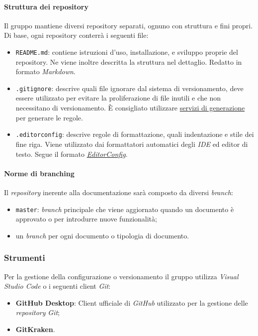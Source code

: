 		\paragraph{Struttura dei repository}
		Il gruppo mantiene diversi repository separati, ognuno con struttura e fini propri.
		Di base, ogni repository conterrà i seguenti file:
		\begin{itemize}
			\item \verb#README.md#: contiene istruzioni d'uso, installazione, e sviluppo proprie del repository. Ne viene inoltre descritta la struttura nel dettaglio. Redatto in formato \textit{Markdown}.
			\item \verb#.gitignore#: descrive quali file ignorare dal sistema di versionamento, deve essere utilizzato per evitare la proliferazione di file inutili e che non necessitano di versionamento. È consigliato utilizzare \href{https://www.toptal.com/developers/gitignore}{servizi di generazione} per generare le regole.
			\item \verb#.editorconfig#: descrive regole di formattazione, quali indentazione e stile dei fine riga. Viene utilizzato dai formattatori automatici degli \textit{IDE} ed editor di testo. Segue il formato \href{https://editorconfig.org/}{\textit{EditorConfig}}.
		\end{itemize}

		\paragraph{Norme di branching}
			Il \emph{repository} inerente alla documentazione sarà composto da diversi \textit{branch}:
			\begin{itemize}
				\item \verb#master#: \emph{branch} principale che viene aggiornato quando un documento è approvato o per introdurre nuove funzionalità; 
				\item un \textit{branch} per ogni documento o tipologia di documento.
			\end{itemize}
		
		\subsubsection{Strumenti}
			Per la gestione della configurazione o versionamento il gruppo utilizza \emph{Visual Studio Code} o i seguenti client \emph{Git}:
				
				\begin{itemize}
					\item \textbf{GitHub Desktop}: Client ufficiale di \emph{GitHub} utilizzato per la gestione delle \emph{repository} \emph{Git};
					\item \textbf{GitKraken}.
				\end{itemize}\
		
